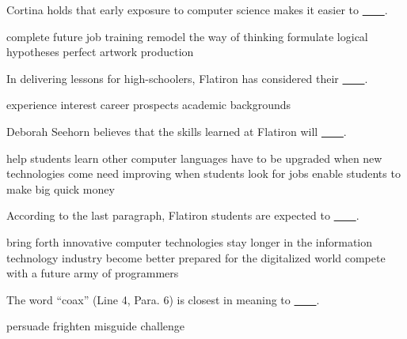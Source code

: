 \item Cortina holds that early exposure to computer science makes it easier to \uline{~~~~}.
\begin{tasks}
	\task complete future job training
	\task remodel the way of thinking
	\task formulate logical hypotheses
	\task perfect artwork production
\end{tasks}
\item In delivering lessons for high-schoolers, Flatiron has considered their \uline{~~~~}.
\begin{tasks}
	\task experience
	\task interest
	\task career prospects
	\task academic backgrounds
\end{tasks}
\item Deborah Seehorn believes that the skills learned at Flatiron will \uline{~~~~}.
\begin{tasks}
	\task help students learn other computer languages
	\task have to be upgraded when new technologies come
	\task need improving when students look for jobs
	\task enable students to make big quick money
\end{tasks}
\item According to the last paragraph, Flatiron students are expected to \uline{~~~~}.
\begin{tasks}
	\task bring forth innovative computer technologies
	\task stay longer in the information technology industry
	\task become better prepared for the digitalized world
	\task compete with a future army of programmers
\end{tasks}
\item The word ``coax'' (Line 4, Para. 6) is closest in meaning to \uline{~~~~}.
\begin{tasks}
	\task persuade
	\task frighten
	\task misguide
	\task challenge
\end{tasks}

